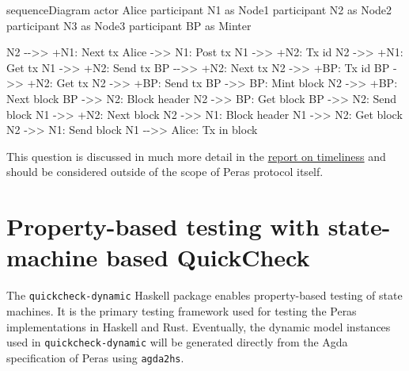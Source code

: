 \documentclass[10pt]{article}
\newenvironment{Shaded}{}{}
\newcommand{\NormalTok}[1]{#1}
\begin{document}
\begin{Shaded}
\begin{Highlighting}[]
\NormalTok{sequenceDiagram}
\NormalTok{actor Alice}
\NormalTok{participant N1 as Node1}
\NormalTok{participant N2 as Node2}
\NormalTok{participant N3 as Node3}
\NormalTok{participant BP as Minter}

\NormalTok{N2 {-}{-}\textgreater{}\textgreater{} +N1: Next tx}
\NormalTok{Alice {-}\textgreater{}\textgreater{} N1: Post tx}
\NormalTok{N1 {-}\textgreater{}\textgreater{} +N2: Tx id}
\NormalTok{N2 {-}\textgreater{}\textgreater{} +N1: Get tx}
\NormalTok{N1 {-}\textgreater{}\textgreater{} +N2: Send tx}
\NormalTok{BP {-}{-}\textgreater{}\textgreater{} +N2: Next tx}
\NormalTok{N2 {-}\textgreater{}\textgreater{} +BP: Tx id}
\NormalTok{BP {-}\textgreater{}\textgreater{} +N2: Get tx}
\NormalTok{N2 {-}\textgreater{}\textgreater{} +BP: Send tx}
\NormalTok{BP {-}\textgreater{}\textgreater{} BP: Mint block}
\NormalTok{N2 {-}\textgreater{}\textgreater{} +BP: Next block}
\NormalTok{BP {-}\textgreater{}\textgreater{} N2: Block header}
\NormalTok{N2 {-}\textgreater{}\textgreater{} BP: Get block}
\NormalTok{BP {-}\textgreater{}\textgreater{} N2: Send block}
\NormalTok{N1 {-}\textgreater{}\textgreater{} +N2: Next block}
\NormalTok{N2 {-}\textgreater{}\textgreater{} N1: Block header}
\NormalTok{N1 {-}\textgreater{}\textgreater{} N2: Get block}
\NormalTok{N2 {-}\textgreater{}\textgreater{} N1: Send block}
\NormalTok{N1 {-}{-}\textgreater{}\textgreater{} Alice: Tx in block}
\end{Highlighting}
\end{Shaded}

This question is discussed in much more detail in the
\href{https://docs.google.com/document/d/1B42ep9mvP472-s6p_1qkVmf_b1-McLNPyXGjGHEVJ0w/edit}{report
on timeliness} and should be considered outside of the scope of Peras
protocol itself.

\section{Property-based testing with state-machine based
QuickCheck}\label{property-based-testing-with-state-machine-based-quickcheck}

The \texttt{quickcheck-dynamic} Haskell package enables property-based
testing of state machines. It is the primary testing framework used for
testing the Peras implementations in Haskell and Rust. Eventually, the
dynamic model instances used in \texttt{quickcheck-dynamic} will be
generated directly from the Agda specification of Peras using
\texttt{agda2hs}.
\end{document}
